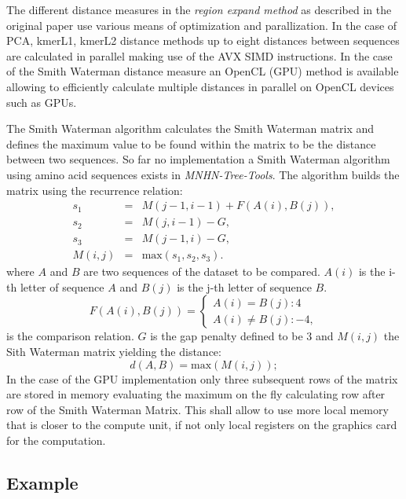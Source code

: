 The different distance measures in the \emph{region expand method} as
described in the original paper use various means of optimization and
parallization. In the case of PCA, kmerL1, kmerL2 distance methods up to eight
distances between sequences are calculated in parallel making use of
the AVX SIMD instructions. In the case of the Smith Waterman distance
measure an OpenCL (GPU) method is available allowing to efficiently calculate
multiple distances in parallel on OpenCL devices such as GPUs. 

The Smith Waterman algorithm calculates the Smith Waterman matrix and
defines the maximum value to be found within the matrix to be the
distance between two sequences. So far no implementation a Smith Waterman
algorithm using amino acid sequences exists in
\emph{MNHN-Tree-Tools}. The algorithm builds the matrix using the
recurrence relation: 
\begin{eqnarray}
s_1&=&M(j-1,i-1)+F(A(i),B(j)), \\ \nonumber
s_2&=&M(j,i-1)-G, \\ \nonumber
s_3&=&M(j-1,i)-G, \\ \nonumber
M(i,j)&=&\mathrm{max}(s_1,s_2,s_3).
\end{eqnarray}
where $A$ and $B$ are two sequences of the dataset to be compared.
$A(i)$ is the i-th letter of sequence $A$ and $B(j)$ is the j-th
letter of sequence $B$.
\begin{equation}
  F(A(i),B(j)) = \left\{
    \begin{array}{l}
      A(i) = B(j) : 4 \\
      A(i) \neq B(j) : -4,
    \end{array} \right.
\end{equation}
is the comparison relation. $G$ is the gap penalty defined to be 3 and
$M(i,j)$ the Sith Waterman matrix yielding the distance:
\begin{equation}
  d(A,B) = \mathrm{max}(M(i,j));
\end{equation}
In the case of the GPU implementation only three subsequent rows of
the matrix are stored in memory evaluating the maximum on the fly
calculating row after row of the Smith Waterman Matrix. This shall
allow to use more local memory that is closer to the compute unit, if
not only local registers on the graphics card for the computation.

\subsection{Example}

